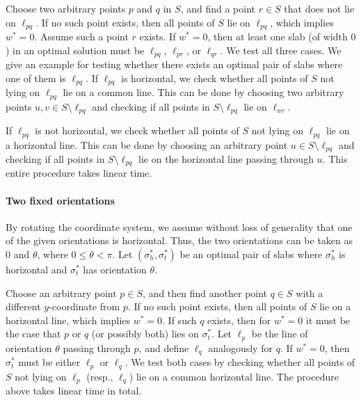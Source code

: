 \documentclass[english,a4paper, cleveref, autoref, thm-restate, nolineno]{socg-lipics-v2021}
\theoremstyle{star}
\theoremstyle{claimstar}
\begin{document}
Choose two arbitrary points $p$ and $q$ in $S$, and find a point $r \in S$ that does not lie on $\ell_{pq}$. 
If no such point exists, then all points of $S$ lie on $\ell_{pq}$, which implies $w^* = 0$.
Assume such a point $r$ exists. 
If $w^* = 0$, then at least one slab (of width $0$) in an optimal solution must be $\ell_{pq}$, $\ell_{pr}$, or $\ell_{qr}$.
We test all three cases. 
We give an example for testing whether there exists an optimal pair of slabs where one of them is $\ell_{pq}$.
If $\ell_{pq}$ is horizontal, we check whether all points of $S$ not lying on $\ell_{pq}$ lie on a common line.
This can be done by choosing two arbitrary points $u, v \in S\setminus \ell_{pq}$ and checking if all points in $S\setminus \ell_{pq}$ lie on $\ell_{uv}$. 

If $\ell_{pq}$ is not horizontal, we check whether all points of $S$ not lying on $\ell_{pq}$ lie on a horizontal line.
This can be done by choosing an arbitrary point $u \in S\setminus \ell_{pq}$ and checking if all points in $S\setminus \ell_{pq}$ lie on the horizontal line passing through $u$. 
This entire procedure takes linear time.

\paragraph*{Two fixed orientations}
By rotating the coordinate system, we assume without loss of generality that one of the given orientations is horizontal. Thus, the two orientations can be taken as $0$ and $\theta$, where $0\le \theta < \pi$. Let $(\sigma_h^*, \sigma_t^* )$ be an optimal pair of slabs where $\sigma_h^*$ is horizontal and $\sigma_t^*$ has orientation $\theta$.

Choose an arbitrary point $p \in S$, and then find another point $q \in S$ with a different $y$-coordinate from $p$. If no such point exists, then all points of $S$ lie on a horizontal line, which implies $w^*=0$.
If such $q$ exists, then for $w^* = 0$ it must be the case that $p$ or $q$ (or possibly both) lies on $\sigma_t^*$.
Let $\ell_p$ be the line of orientation $\theta$ passing through $p$, and define $\ell_q$ analogously for $q$.
If $w^* = 0$, then $\sigma_t^*$ must be either $\ell_p$ or $\ell_q$.
We test both cases by checking whether all points of $S$ not lying on $\ell_p$ (resp., $\ell_q$) lie on a common horizontal line. 
The procedure above takes linear time in total.
\end{document}
